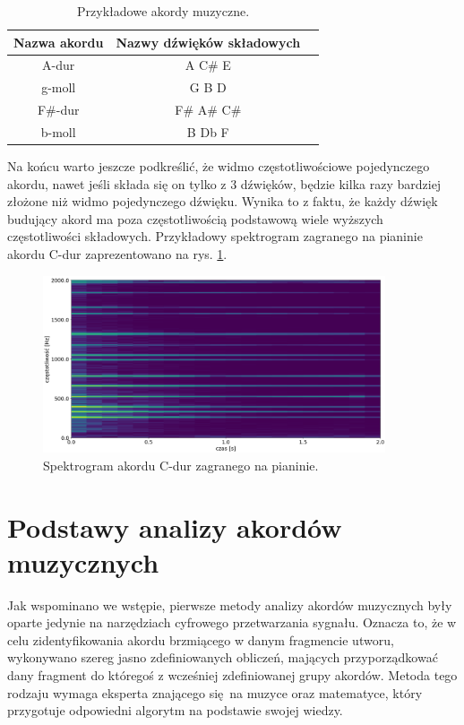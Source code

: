 \begin{table}[htb]
    \centering
    \caption{Przykładowe akordy muzyczne.}
    \label{tab:przykladowe_akordy}
    \begin{tabular}{|c|c|c|} \hline
        Nazwa akordu & Nazwy dźwięków składowych \\ \hline
        A-dur   & A  C\# E  \\
        g-moll  & G  B  D  \\
        F\#-dur  & F\# A\# C\# \\
        b-moll  & B  Db F  \\ \hline
    \end{tabular}
\end{table}

Na końcu warto jeszcze podkreślić, że widmo częstotliwościowe pojedynczego akordu, nawet jeśli
składa się on tylko z $3$ dźwięków, będzie kilka razy bardziej złożone niż widmo pojedynczego
dźwięku. Wynika to z faktu, że każdy dźwięk budujący akord ma poza częstotliwością podstawową wiele
wyższych częstotliwości składowych. Przykładowy spektrogram zagranego na pianinie akordu C-dur
zaprezentowano na rys. \ref{fig:spektrogram_cdur}.

\begin{figure}[htb]
    \centering
    \includegraphics[width=0.9\textwidth]{images/spektrogram_cdur}
    \caption{Spektrogram akordu C-dur zagranego na pianinie.}
    \label{fig:spektrogram_cdur}
\end{figure}



\section{Podstawy analizy akordów muzycznych}

Jak wspominano we wstępie, pierwsze metody analizy akordów muzycznych były oparte jedynie na narzędziach cyfrowego przetwarzania sygnału. Oznacza to, że w celu zidentyfikowania akordu brzmiącego w danym fragmencie utworu, wykonywano szereg jasno zdefiniowanych obliczeń, mających przyporządkować dany fragment do któregoś z wcześniej zdefiniowanej grupy akordów. Metoda tego rodzaju wymaga eksperta znającego się na muzyce oraz matematyce, który przygotuje odpowiedni algorytm na podstawie swojej wiedzy.

